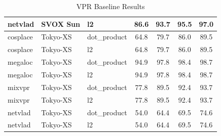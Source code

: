 \begin{table}[h]
\begin{tabular}{l|l|l|c|c|c|c}
netvlad & SVOX Sun & l2 & 86.6 & 93.7 & 95.5 & 97.0 \\
\hline
cosplace & Tokyo-XS & dot\_product & 64.8 & 79.7 & 86.0 & 89.5 \\
cosplace & Tokyo-XS & l2 & 64.8 & 79.7 & 86.0 & 89.5 \\
megaloc & Tokyo-XS & dot\_product & 94.9 & 97.8 & 98.4 & 98.7 \\
megaloc & Tokyo-XS & l2 & 94.9 & 97.8 & 98.4 & 98.7 \\
mixvpr & Tokyo-XS & dot\_product & 77.8 & 89.5 & 92.4 & 93.7 \\
mixvpr & Tokyo-XS & l2 & 77.8 & 89.5 & 92.4 & 93.7 \\
netvlad & Tokyo-XS & dot\_product & 54.0 & 64.4 & 69.5 & 74.6 \\
netvlad & Tokyo-XS & l2 & 54.0 & 64.4 & 69.5 & 74.6 \\
\hline
\end{tabular}
\caption{VPR Baseline Results}
\label{tab:baseline_results}
\end{table}